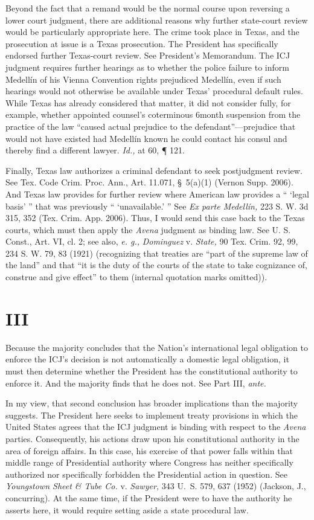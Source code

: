  Beyond the fact that a remand would be the normal course upon
reversing a lower court judgment, there are additional reasons why
further state-court review would be particularly appropriate here. The
crime took place in Texas, and the prosecution at issue is a Texas
prosecution. The President has specifically endorsed further Texas-court
review. See President's Memorandum. The ICJ judgment requires further
hearings as to whether the police failure to inform Medellín of his
Vienna Convention rights prejudiced Medellín, even if such hearings
would not otherwise be available under Texas' procedural default
rules. While Texas has already considered that matter, it did not
consider fully, for example, whether appointed counsel's coterminous
6month suspension from the practice of the law ``caused actual
prejudice to the defendant''---prejudice that would not have existed
had Medellín known he could contact his consul and thereby find a
different lawyer. \emph{Id.,} at 60, ¶ 121.

  Finally, Texas law authorizes a criminal defendant to seek
postjudgment review. See Tex. Code Crim. Proc. Ann., Art. 11.071,
\S~5(a)(1) (Vernon Supp. 2006). And Texas law provides for further
review where American law provides a `` ‘legal basis' '' that was
previously `` ‘unavailable.' '' See \emph{Ex parte Medellín,} 223
S. W. 3d 315, 352 (Tex. Crim. App. 2006). Thus, I would send this case
back to the Texas courts, which must then apply the \emph{Avena} judgment
as binding law. See U. S. Const., Art. VI, cl. 2; see also, \emph{e. g.,}
\newpage  \emph{Dominguez} v. \emph{State,} 90 Tex. Crim. 92, 99, 234 S. W. 79,
83 (1921) (recognizing that treaties are ``part of the supreme law
of the land'' and that ``it is the duty of the courts of the state
to take cognizance of, construe and give effect'' to them (internal
quotation marks omitted)).

\section{III}

  Because the majority concludes that the Nation's international
legal obligation to enforce the ICJ's decision is not automatically a
domestic legal obligation, it must then determine whether the President
has the constitutional authority to enforce it. And the majority finds
that he does not. See Part III, \emph{ante.}

  In my view, that second conclusion has broader implications than
the majority suggests. The President here seeks to implement treaty
provisions in which the United States agrees that the ICJ judgment
is binding with respect to the \emph{Avena} parties. Consequently, his
actions draw upon his constitutional authority in the area of foreign
affairs. In this case, his exercise of that power falls within that
middle range of Presidential authority where Congress has neither
specifically authorized nor specifically forbidden the Presidential
action in question. See \emph{Youngstown Sheet \& Tube Co.} v. \emph{Sawyer,}
343 U.~S. 579, 637 (1952) (Jackson, J., concurring). At the same
time, if the President were to have the authority he asserts here, it
would require setting aside a state procedural law.

